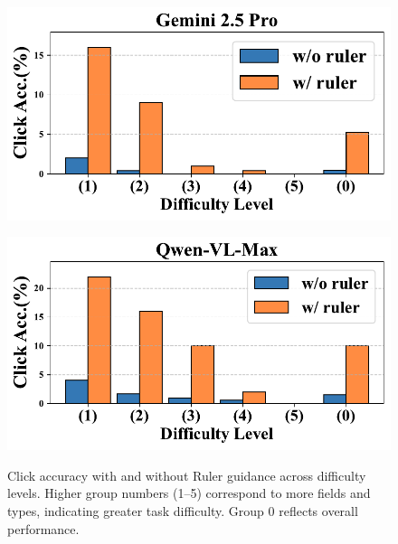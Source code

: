 \documentclass[sigconf, screen, review]{acmart}
\begin{document}
\begin{figure}[htbp]
    \centering
    \begin{minipage}{0.48\linewidth}
        \centering
        \includegraphics[width=\linewidth]{figs/1.pdf}
        \label{fig:ruler1}
    \end{minipage}
    \hspace{0.01\linewidth}
    \begin{minipage}{0.48\linewidth}
        \centering
        \includegraphics[width=\linewidth]{figs/2.pdf}
        \label{fig:ruler2}
    \end{minipage}
    \vspace{-15pt}
    \caption{
    Click accuracy with and without Ruler guidance across difficulty levels. Higher group numbers (1–5) correspond to more fields and types, indicating greater task difficulty. Group 0 reflects overall performance.
    }
    \label{fig:ruler_res}
\vspace{-10pt}
\end{figure}
\end{document}

